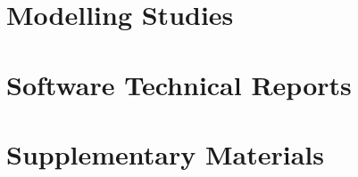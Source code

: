 \documentclass{ut-thesis}
\begin{document}



\part{Modelling Studies}







\part{Software Technical Reports}



\part{Supplementary Materials}











\end{document}
